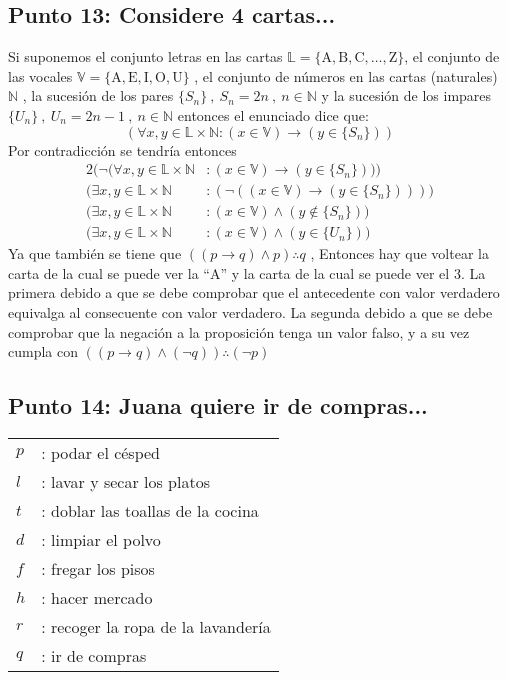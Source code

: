 \documentclass{article}
\newcommand{\q}[1]{``#1''}
\begin{document}
\subsection{Punto 13: Considere 4 cartas...}
Si suponemos el conjunto letras en las cartas $\mathbb{L} = \{\textrm{A}, \textrm{B}, \textrm{C}, \dots , \textrm{Z}\}$, el conjunto de las vocales $\mathbb{V} = \{\textrm{A}, \textrm{E}, \textrm{I}, \textrm{O}, \textrm{U}\}$ , el conjunto de números en las cartas (naturales) $\mathbb{N}$ , la sucesión de los pares $\{S_n\}\ ,\ S_n = 2n\ ,\ n\in \mathbb{N}$ y la sucesión de los impares $\{U_n\}\ ,\ U_n = 2n - 1\ ,\ n \in \mathbb{N}$ entonces el enunciado dice que:
$$(\forall x, y \in \mathbb{L} \times \mathbb{N} : (x \in \mathbb{V}) \to (y \in \{S_n\}))$$
Por contradicción se tendría entonces
\begin{alignat*}{2}
    (\lnot (\forall x, y \in \mathbb{L} \times \mathbb{N} &: (x \in \mathbb{V}) \to (y \in \{S_n\})))\\
    (\exists x, y \in \mathbb{L} \times \mathbb{N} &: (\lnot ((x \in \mathbb{V}) \to (y \in \{S_n\}))))\\
    (\exists x, y \in \mathbb{L} \times \mathbb{N} &: (x \in \mathbb{V}) \wedge (y \notin \{S_n\}))\\
    (\exists x, y \in \mathbb{L} \times \mathbb{N} &: (x \in \mathbb{V}) \wedge (y \in \{U_n\}))
\end{alignat*}
Ya que también se tiene que $((p \to q) \wedge p) \therefore q$ , Entonces hay que voltear la carta de la cual se puede ver la \q{A} y la carta de la cual se puede ver el 3.
La primera debido a que se debe comprobar que el antecedente con valor verdadero equivalga al consecuente con valor verdadero.
La segunda debido a que se debe comprobar que la negación a la proposición tenga un valor falso, y a su vez cumpla con $((p \to q) \wedge (\lnot q)) \therefore (\lnot p)$

\subsection{Punto 14: Juana quiere ir de compras...}
\begin{center}
    \begin{NiceTabular}{l l}
        $p$ &: podar el césped\\
        $l$ &: lavar y secar los platos\\
        $t$ &: doblar las toallas de la cocina\\
        $d$ &: limpiar el polvo\\
        $f$ &: fregar los pisos\\
        $h$ &: hacer mercado\\
        $r$ &: recoger la ropa de la lavandería\\
        $q$ &: ir de compras\\
    \end{NiceTabular}
\end{center}
\end{document}
